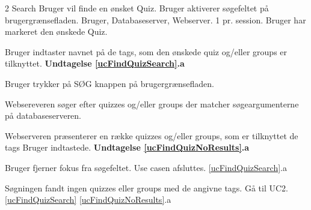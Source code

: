 \uchead
	{2}
	{Search}
	{Bruger vil finde en ønsket Quiz.}
	{Bruger aktiverer søgefeltet på brugergrænsefladen.}
	{Bruger, Databaseserver, Webserver.}
	{} %
	{}
	{1 pr. session.}
	{Bruger har markeret den ønskede Quiz.}

\item \label{ucFindQuizSearch} Bruger indtaster navnet på de tags, som den ønskede quiz og/eller groups er tilknyttet. 
\textbf{Undtagelse \ref{ucFindQuizSearch}.a}
\item Bruger trykker på SØG knappen på brugergrænsefladen.
\item Websereveren søger efter quizzes og/eller groups der matcher søgeargumenterne på databaseserveren.

\item \label{ucFindQuizNoResults} Webserveren præsenterer en række quizzes og/eller groups, som er tilknyttet de tags Bruger indtastede.
\textbf{Undtagelse \ref{ucFindQuizNoResults}.a}


\ucdescriptionend

\ucextension
	{Bruger fjerner fokus fra søgefeltet.}
	{Use casen afsluttes.}
	{\ref{ucFindQuizSearch}.a}

\ucextension
	{Søgningen fandt ingen quizzes eller groups med de angivne tags.}
	{Gå til UC2.\ref{ucFindQuizSearch}}
	{\ref{ucFindQuizNoResults}.a}
				
